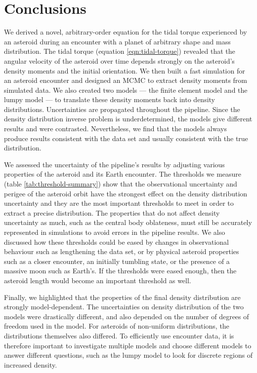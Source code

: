 \documentclass[fleqn,usenatbib]{mnras}
\begin{document}
\section{Conclusions}

We derived a novel, arbitrary-order equation for the tidal torque experienced by an asteroid during an encounter with a planet of arbitrary shape and mass distribution. The tidal torque (equation \ref{eqn:tidal-torque}) revealed that the angular velocity of the asteroid over time depends strongly on the asteroid's density moments and the initial orientation. We then built a fast simulation for an asteroid encounter and designed an MCMC to extract density moments from simulated data. We also created two models --- the finite element model and the lumpy model --- to translate these density moments back into density distributions. Uncertainties are propagated throughout the pipeline. Since the density distribution inverse problem is underdetermined, the models give different results and were contrasted. Nevertheless, we find that the models always produce results consistent with the data set and usually consistent with the true distribution.

We assessed the uncertainty of the pipeline's results by adjusting various properties of the asteroid and its Earth encounter. The thresholds we measure (table \ref{tab:threshold-summary}) show that the observational uncertainty and perigee of the asteroid orbit have the strongest effect on the density distribution uncertainty and they are the most important thresholds to meet in order to extract a precise distribution. The properties that do not affect density uncertainty as much, such as the central body oblateness, must still be accurately represented in simulations to avoid errors in the pipeline results. We also discussed how these thresholds could be eased by changes in observational behaviour such as lengthening the data set, or by physical asteroid properties such as a closer encounter, an initially tumbling state, or the presence of a massive moon such as Earth's. If the thresholds were eased enough, then the asteroid length would become an important threshold as well.

Finally, we highlighted that the properties of the final density distribution are strongly model-dependent. The uncertainties on density distribution of the two models were drastically different, and also depended on the number of degrees of freedom used in the model. For asteroids of non-uniform distributions, the distributions themselves also differed. To efficiently use encounter data, it is therefore important to investigate multiple models and choose different models to answer different questions, such as the lumpy model to look for discrete regions of increased density.
\end{document}
